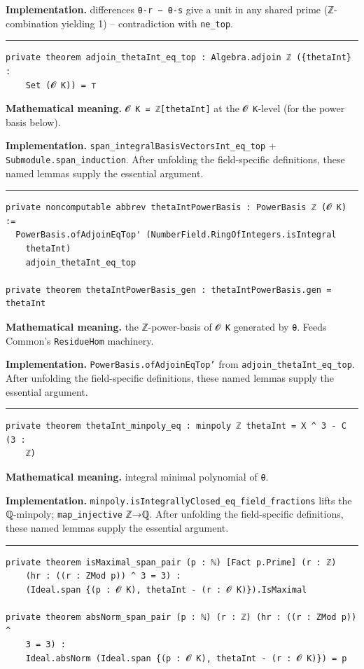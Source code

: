 \documentclass[UTF8,a4paper,11pt,fontset=fandol]{ctexart}
\theoremstyle{definition}
\newcommand{\statementsep}{\par\medskip\hrule\medskip}
\begin{document}
\noindent\textbf{Implementation.} differences \texttt{θ-r − θ-s} give a unit in any shared prime (ℤ-combination yielding 1) -- contradiction with \texttt{ne\_\allowbreak{}top}.\par
\statementsep
\begin{verbatim}
private theorem adjoin_thetaInt_eq_top : Algebra.adjoin ℤ ({thetaInt} :
    Set (𝓞 K)) = ⊤
\end{verbatim}
\noindent\textbf{Mathematical meaning.} \texttt{𝓞 K = ℤ[thetaInt]} at the \texttt{𝓞 K}-level (for the power basis below).\par
\noindent\textbf{Implementation.} \texttt{span\_\allowbreak{}integralBasisVectorsInt\_\allowbreak{}eq\_\allowbreak{}top} + \texttt{Submodule.\allowbreak{}span\_\allowbreak{}induction}. After unfolding the field-specific definitions, these named lemmas supply the essential argument.\par
\statementsep
\begin{verbatim}
private noncomputable abbrev thetaIntPowerBasis : PowerBasis ℤ (𝓞 K) :=
  PowerBasis.ofAdjoinEqTop' (NumberField.RingOfIntegers.isIntegral
    thetaInt)
    adjoin_thetaInt_eq_top

private theorem thetaIntPowerBasis_gen : thetaIntPowerBasis.gen = thetaInt
\end{verbatim}
\noindent\textbf{Mathematical meaning.} the ℤ-power-basis of \texttt{𝓞 K} generated by \texttt{θ}. Feeds Common's \texttt{ResidueHom} machinery.\par
\noindent\textbf{Implementation.} \texttt{PowerBasis.\allowbreak{}ofAdjoinEqTop'} from \texttt{adjoin\_\allowbreak{}thetaInt\_\allowbreak{}eq\_\allowbreak{}top}. After unfolding the field-specific definitions, these named lemmas supply the essential argument.\par
\statementsep
\begin{verbatim}
private theorem thetaInt_minpoly_eq : minpoly ℤ thetaInt = X ^ 3 - C (3 :
    ℤ)
\end{verbatim}
\noindent\textbf{Mathematical meaning.} integral minimal polynomial of \texttt{θ}.\par
\noindent\textbf{Implementation.} \texttt{minpoly.\allowbreak{}isIntegrallyClosed\_\allowbreak{}eq\_\allowbreak{}field\_\allowbreak{}fractions} lifts the ℚ-minpoly; \texttt{map\_\allowbreak{}injective} ℤ→ℚ. After unfolding the field-specific definitions, these named lemmas supply the essential argument.\par
\statementsep
\begin{verbatim}
private theorem isMaximal_span_pair (p : ℕ) [Fact p.Prime] (r : ℤ)
    (hr : ((r : ZMod p)) ^ 3 = 3) :
    (Ideal.span {(p : 𝓞 K), thetaInt - (r : 𝓞 K)}).IsMaximal

private theorem absNorm_span_pair (p : ℕ) (r : ℤ) (hr : ((r : ZMod p)) ^
    3 = 3) :
    Ideal.absNorm (Ideal.span {(p : 𝓞 K), thetaInt - (r : 𝓞 K)}) = p
\end{verbatim}
\end{document}
